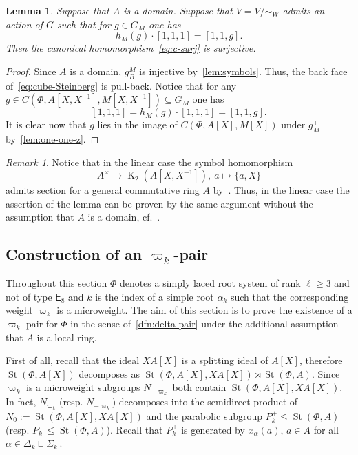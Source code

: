 \documentclass[oneside, 10pt]{amsart}
\DeclareMathOperator{\St}{St}
\DeclareMathOperator{\K}{K}
\newcommand{\rE}{\mathsf{E}}
\newcommand{\inv}{^{-1}}
\numberwithin{equation}{section}
\numberwithin{thm}{section}
\newtheorem{lemma}[thm]{Lemma}
\numberwithin{lemma}{section}
\theoremstyle{definition}
\theoremstyle{remark}
\newtheorem{rem}[lemma]{Remark}
\begin{document}
\begin{lemma} \label{lem:second-reduction}
Suppose that $A$ is a domain.
Suppose that $\overline{V} = V/\sim_W$ admits an action of $G$ such that
for $g \in G_M$ one has \[ h_M(g) \cdot [1, 1, 1] = [1, 1, g]. \]
Then the canonical homomorphism~\eqref{eq:c-surj} is surjective.
\end{lemma}
\begin{proof}
Since $A$ is a domain, $g^M_B$ is injective by~\cref{lem:symbols}.
Thus, the back face of~\eqref{eq:cube-Steinberg} is pull-back.
Notice that for any $g \in C(\Phi, A[X, X\inv], M[X, X\inv]) \subseteq G_M$ one has
\[ [1, 1, 1] = h_M(g) \cdot [1, 1, 1] = [1, 1, g].\]
It is clear now that $g$ lies in the image of $C(\Phi, A[X], M[X])$ under $g^+_M$ by~\cref{lem:one-one-z}.
\end{proof}

\begin{rem}
Notice that in the linear case the symbol homomorphism \[A^\times \to \K_2(A[X, X\inv]),\ a \mapsto \{a, X\}\] admits section
for a general commutative ring $A$ by~\cite{Wa71}.
Thus, in the linear case the assertion of the lemma can be proven by the same argument without the assumption that $A$ is a domain, cf.~\cite[Lemma~3.1g]{Tu83}.
\end{rem}

\subsection{Construction of an $\varpi_k$-pair} \label{subsec:construction-sigma}
Throughout this section $\Phi$ denotes a simply laced root system of rank $\ell \geq 3$ and not of type $\rE_8$ and $k$ is the index of
a simple root $\alpha_k$ such that the corresponding weight $\varpi_k$ is a microweight.
The aim of this section is to prove the existence of a $\varpi_k$-pair for $\Phi$ in the sense of~\cref{dfn:delta-pair}
under the additional assumption that $A$ is a local ring.

First of all, recall that the ideal $XA[X]$ is a splitting ideal of $A[X]$, therefore
$\St(\Phi, A[X])$ decomposes as $\St(\Phi, A[X], XA[X]) \rtimes \St(\Phi, A)$.
Since $\varpi_k$ is a microweight subgroups $N_{\pm \varpi_k}$ both contain $\St(\Phi, A[X], XA[X])$.
In fact, $N_{\varpi_k}$ (resp. $N_{-\varpi_k}$) decomposes into the semidirect product of $N_0 := \St(\Phi, A[X], XA[X])$ and the parabolic subgroup $P_k^+ \leq \St(\Phi, A)$ (resp. $P_k^-\leq \St(\Phi, A)$).
Recall that $P_k^\pm$ is generated by $x_\alpha(a)$, $a \in A$ for all $\alpha \in \Delta_k \sqcup \Sigma^\pm_k$.
\end{document}

